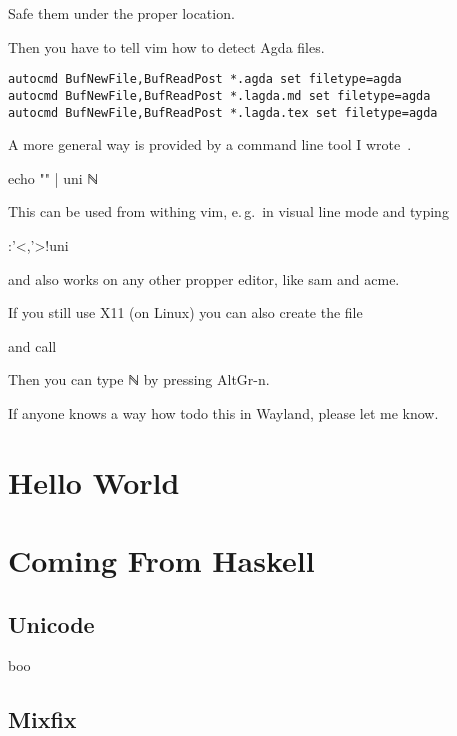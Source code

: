 \documentclass[12pt]{article}
\begin{document}
Safe them under the proper location.

Then you have to tell vim how to detect Agda files.
\begin{lstlisting}[caption={.vim/ftdetect/agda.vim}]
autocmd BufNewFile,BufReadPost *.agda set filetype=agda
autocmd BufNewFile,BufReadPost *.lagda.md set filetype=agda
autocmd BufNewFile,BufReadPost *.lagda.tex set filetype=agda
\end{lstlisting}

A more general way is provided by a command line tool I wrote~\cite{scripts-uni}.

\begin{neolisting}
echo "\N" | uni
ℕ
\end{neolisting}

This can be used from withing vim, e. g.\ in visual line mode and typing
\begin{neolisting}
:'<,'>!uni
\end{neolisting}
and also works on any other propper editor, like sam and acme.

If you still use X11 (on Linux) you can also create the file

and call

Then you can type ℕ by pressing AltGr-n.

If anyone knows a way how todo this in Wayland, please let me know.

\section{Hello World}


\section{Coming From Haskell}
\subsection{Unicode}
boo

\subsection{Mixfix}

\printbibliography{}
\end{document}
